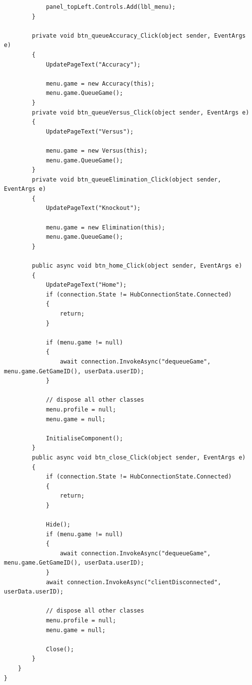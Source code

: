 \documentclass{article}
\begin{document}
\begin{verbatim}
			panel_topLeft.Controls.Add(lbl_menu);
		}

		private void btn_queueAccuracy_Click(object sender, EventArgs e)
		{
			UpdatePageText("Accuracy");

			menu.game = new Accuracy(this);
			menu.game.QueueGame();
		}
		private void btn_queueVersus_Click(object sender, EventArgs e)
		{
			UpdatePageText("Versus");

			menu.game = new Versus(this);
			menu.game.QueueGame();
		}
		private void btn_queueElimination_Click(object sender, EventArgs e)
		{
			UpdatePageText("Knockout");

			menu.game = new Elimination(this);
			menu.game.QueueGame();
		}

		public async void btn_home_Click(object sender, EventArgs e)
		{
			UpdatePageText("Home");
			if (connection.State != HubConnectionState.Connected)
			{
				return;
			}

			if (menu.game != null)
			{
				await connection.InvokeAsync("dequeueGame", menu.game.GetGameID(), userData.userID);
			}

			// dispose all other classes
			menu.profile = null;
			menu.game = null;

			InitialiseComponent();
		}
		public async void btn_close_Click(object sender, EventArgs e)
		{
			if (connection.State != HubConnectionState.Connected)
			{
				return;
			}

			Hide();
			if (menu.game != null)
			{
				await connection.InvokeAsync("dequeueGame", menu.game.GetGameID(), userData.userID);
			}
			await connection.InvokeAsync("clientDisconnected", userData.userID);

			// dispose all other classes
			menu.profile = null;
			menu.game = null;

			Close();
		}
	}
}
\end{verbatim}
\end{document}
